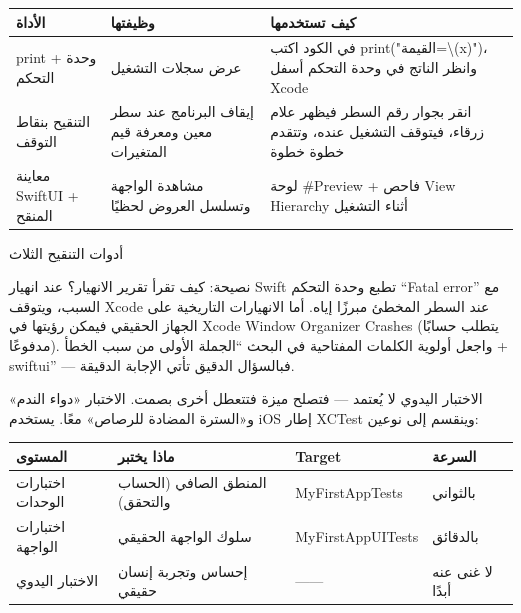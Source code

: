 


\begin{center}
\begin{tabularx}{\linewidth}{|X|X|X|}
\hline
\textbf{الأداة} & \textbf{وظيفتها} & \textbf{كيف تستخدمها} \tabularnewline
\hline
print + وحدة التحكم & عرض سجلات التشغيل & في الكود اكتب print("القيمة=\textbackslash{}(x)")، وانظر الناتج في وحدة التحكم أسفل Xcode \tabularnewline
التنقيح بنقاط التوقف & إيقاف البرنامج عند سطر معين ومعرفة قيم المتغيرات & انقر بجوار رقم السطر فيظهر علام زرقاء، فيتوقف التشغيل عنده، وتتقدم خطوة خطوة \tabularnewline
معاينة SwiftUI + المنقح & مشاهدة الواجهة وتسلسل العروض لحظيًا & لوحة \#Preview + فاحص View Hierarchy أثناء التشغيل \tabularnewline
\hline
\end{tabularx}
\end{center}

\begin{center}\small\color{gray}أدوات التنقيح الثلاث\end{center}

\begin{tcbinfo}{نصيحة: كيف تقرأ تقرير الانهيار؟}
عند انهيار Swift تطبع وحدة التحكم “Fatal error” مع السبب، ويتوقف Xcode عند السطر المخطئ مبرزًا إياه. أما الانهيارات التاريخية على الجهاز الحقيقي فيمكن رؤيتها في Xcode Window Organizer Crashes (يتطلب حسابًا مدفوعًا). واجعل أولوية الكلمات المفتاحية في البحث “الجملة الأولى من سبب الخطأ + swiftui” — فبالسؤال الدقيق تأتي الإجابة الدقيقة.

\end{tcbinfo}


الاختبار اليدوي لا يُعتمد — فتصلح ميزة فتتعطل أخرى بصمت. الاختبار «دواء الندم» و«السترة المضادة للرصاص» معًا. يستخدم iOS إطار XCTest وينقسم إلى نوعين:

\begin{center}
\begin{tabularx}{\linewidth}{|X|X|X|X|}
\hline
\textbf{المستوى} & \textbf{ماذا يختبر} & \textbf{Target} & \textbf{السرعة} \tabularnewline
\hline
اختبارات الوحدات & المنطق الصافي (الحساب والتحقق) & MyFirstAppTests & بالثواني \tabularnewline
اختبارات الواجهة & سلوك الواجهة الحقيقي & MyFirstAppUITests & بالدقائق \tabularnewline
الاختبار اليدوي & إحساس وتجربة إنسان حقيقي & —— & لا غنى عنه أبدًا \tabularnewline
\hline
\end{tabularx}
\end{center}

